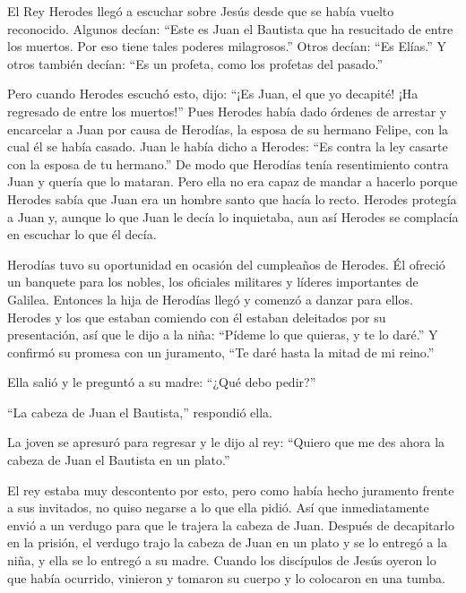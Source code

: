  El Rey Herodes llegó a escuchar sobre Jesús desde que se
había vuelto reconocido. Algunos decían: ``Este es Juan el Bautista que
ha resucitado de entre los muertos. Por eso tiene tales poderes
milagrosos.''  Otros decían: ``Es Elías.'' Y otros también
decían: ``Es un profeta, como los profetas del pasado.''

 Pero cuando Herodes escuchó esto, dijo: ``¡Es Juan, el que
yo decapité! ¡Ha regresado de entre los muertos!''  Pues
Herodes había dado órdenes de arrestar y encarcelar a Juan por causa de
Herodías, la esposa de su hermano Felipe, con la cual él se había
casado.  Juan le había dicho a Herodes: ``Es contra la ley
casarte con la esposa de tu hermano.''  De modo que
Herodías tenía resentimiento contra Juan y quería que lo mataran. Pero
ella no era capaz de mandar a hacerlo  porque Herodes sabía
que Juan era un hombre santo que hacía lo recto. Herodes protegía a Juan
y, aunque lo que Juan le decía lo inquietaba, aun así Herodes se
complacía en escuchar lo que él decía.

 Herodías tuvo su oportunidad en ocasión del cumpleaños de
Herodes. Él ofreció un banquete para los nobles, los oficiales militares
y líderes importantes de Galilea.  Entonces la hija de
Herodías llegó y comenzó a danzar para ellos. Herodes y los que estaban
comiendo con él estaban deleitados por su presentación, así que le dijo
a la niña:  ``Pídeme lo que quieras, y te lo daré.'' Y
confirmó su promesa con un juramento, ``Te daré hasta la mitad de mi
reino.''

 Ella salió y le preguntó a su madre: ``¿Qué debo pedir?''

``La cabeza de Juan el Bautista,'' respondió ella.

 La joven se apresuró para regresar y le dijo al rey:
``Quiero que me des ahora la cabeza de Juan el Bautista en un plato.''

 El rey estaba muy descontento por esto, pero como había
hecho juramento frente a sus invitados, no quiso negarse a lo que ella
pidió.  Así que inmediatamente envió a un verdugo para que
le trajera la cabeza de Juan. Después de decapitarlo en la prisión,
 el verdugo trajo la cabeza de Juan en un plato y se lo
entregó a la niña, y ella se lo entregó a su madre.  Cuando
los discípulos de Jesús oyeron lo que había ocurrido, vinieron y tomaron
su cuerpo y lo colocaron en una tumba.

